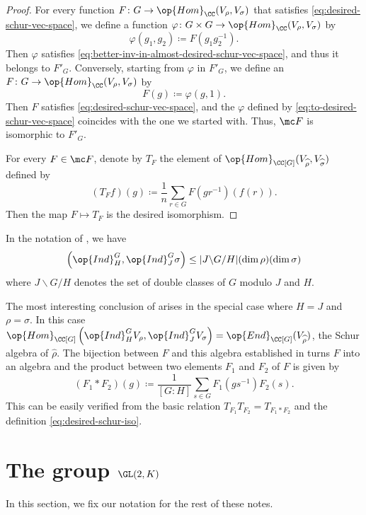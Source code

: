 \documentclass[../main.tex]{subfiles}
\begin{document}
\begin{proof}
	For every function $F\colon G\to\op{Hom}_\CC(V_\rho,V_\sigma)$ that satisfies \eqref{eq:desired-schur-vec-space}, we define a function $\varphi\colon G\times G\to\op{Hom}_\CC(V_\rho,V_\sigma)$ by
	\begin{equation}
		\varphi(g_1,g_2)\coloneqq F\left(g_1g_2^{-1}\right). \label{eq:to-desired-schur-vec-space}
	\end{equation}
	Then $\varphi$ satisfies \eqref{eq:better-inv-in-almost-desired-schur-vec-space}, and thus it belongs to $F'_G$. Conversely, starting from $\varphi$ in $F'_G$, we define an $F\colon G\to\op{Hom}_\CC(V_\rho,V_\sigma)$ by
	\[F(g)\coloneqq\varphi(g,1).\]
	Then $F$ satisfies \eqref{eq:desired-schur-vec-space}, and the $\varphi$ defined by \eqref{eq:to-desired-schur-vec-space} coincides with the one we started with. Thus, $\mc F$ is isomorphic to $F'_G$.

	For every $F\in\mc F$, denote by $T_F$ the element of $\op{Hom}_{\CC[G]}(V_{\widehat\rho},V_{\widehat\sigma})$ defined by
	\begin{equation}
		(T_Ff)(g)\coloneqq\frac1n\sum_{r\in G}F\left(gr^{-1}\right)(f(r)). \label{eq:desired-schur-iso}
	\end{equation}
	Then the map $F\mapsto T_F$ is the desired isomorphism.
\end{proof}
\begin{corollary} \label{cor:dim-homs-of-ind}
	In the notation of , we have
	\[\left(\op{Ind}^G_H,\op{Ind}^G_J\sigma\right)\le|J\backslash G/H|(\dim\rho)(\dim\sigma)\]
	where $J\backslash G/H$ denotes the set of double classes of $G$ modulo $J$ and $H$.
\end{corollary}
The most interesting conclusion of  arises in the special case where $H=J$ and $\rho=\sigma$. In this case $\op{Hom}_{\CC[G]}\left(\op{Ind}^G_HV_\rho,\op{Ind}^G_JV_\sigma\right)=\op{End}_{\CC[G]}(V_{\widehat\rho})$, the Schur algebra of $\widehat\rho$. The bijection between $F$ and this algebra established in  turns $F$ into an algebra and the product between two elements $F_1$ and $F_2$ of $F$ is given by
\begin{equation}
	(F_1*F_2)(g)\coloneqq\frac1{[G:H]}\sum_{s\in G}F_1\left(gs^{-1}\right)F_2(s). \label{eq:better-schur-ind-mult}
\end{equation}
This can be easily verified from the basic relation $T_{F_1}T_{F_2}=T_{F_1*F_2}$ and the definition \eqref{eq:desired-schur-iso}.

\section{The group \texorpdfstring{$\GL(2,K)$}{ GL(2,K)}} \label{sec:gl-2-k-struct}
In this section, we fix our notation for the rest of these notes.
\end{document}
